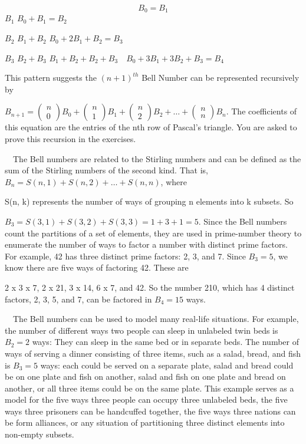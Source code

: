 \documentclass{article}
\begin{document}
\begin{equation*}
B_0=B_1
\end{equation*}
 $B_1$   $B_0+B_1=B_2$

 $B_2$   $B_1+B_2$   $B_0+2B_1+B_2=B_3$

 $B_3$   $B_2+B_3$   $B_1+B_2+B_2+B_3$\ \  $B_0+3B_1+3B_2+B_3=B_4$

This pattern suggests the  $(n+1)^{\mathit{th}}$ Bell Number can be represented recursively by 


$B_{n+1}=\left(\begin{matrix}n\\0\end{matrix}\right)B_0+\left(\begin{matrix}n\\1\end{matrix}\right)B_1+\left(\begin{matrix}n\\2\end{matrix}\right)B_2+{\dots}+\left(\begin{matrix}n\\n\end{matrix}\right)B_n$.
The coefficients of this equation are the entries of the nth row of Pascal’s triangle. You are asked to prove this
recursion in the exercises.

\ \ The Bell numbers are related to the Stirling numbers and can be defined as the sum of the Stirling numbers of the
second kind. That is,  $B_n=S\left(n,1\right)+S\left(n,2\right)+{\dots}+S(n,n)$, where

 S(n, k) represents the number of ways of grouping n elements into k subsets. So 

 $B_3=S\left(3,1\right)+S\left(3,2\right)+S\left(3,3\right)=1+3+1=5.$ Since the Bell numbers count the partitions of a
set of elements, they are used in prime-number theory to enumerate the number of ways to factor a number with distinct
prime factors. For example, 42 has three distinct prime factors: 2, 3, and 7. Since  $B_3=5$, we know there are five
ways of factoring 42. These are 

2 x 3 x 7, 2 x 21, 3 x 14, 6 x 7, and 42. So the number 210, which has 4 distinct factors, 2, 3, 5, and 7, can be
factored in  $B_4=15$ ways. 

\ \ The Bell numbers can be used to model many real-life situations. For example, the number of different ways two
people can sleep in unlabeled twin beds is  $B_2=2$ ways: They can sleep in the same bed or in separate beds. The
number of ways of serving a dinner consisting of three items, such as a salad, bread, and fish is  $B_3=5$ ways: each
could be served on a separate plate, salad and bread could be on one plate and fish on another, salad and fish on one
plate and bread on another, or all three items could be on the same plate. This example serves as a model for the five
ways three people can occupy three unlabeled beds, the five ways three prisoners can be handcuffed together, the five
ways three nations can be form alliances, or any situation of partitioning three distinct elements into non-empty
subsets. 
\end{document}
